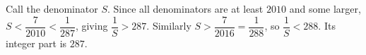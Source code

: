 Call the denominator $S$. Since all denominators are at least $2010$ and some larger, $S<\dfrac{7}{2010}<\dfrac{1}{287}$, giving $\dfrac{1}{S}>287$. Similarly $S>\dfrac{7}{2016}=\dfrac{1}{288}$, so $\dfrac{1}{S}<288$. Its integer part is $\boxed{287}$.
